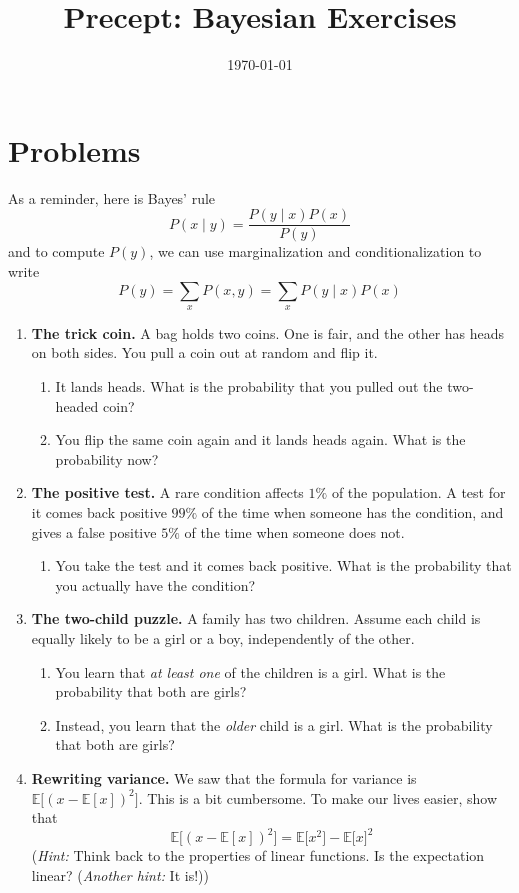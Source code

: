 \documentclass[11pt]{article}
\title{Precept: Bayesian Exercises}
\date{\today}
\newcommand{\E}{\mathbb{E}}
\begin{document}
\maketitle
\thispagestyle{fancy}

\section*{Problems}
As a reminder, here is Bayes' rule
\[
P(x\mid y) = \frac{P(y\mid x)P(x)}{P(y)}
\]
and to compute $P(y)$, we can use marginalization and conditionalization to write
\[
P(y) = \sum_x P(x,y) = \sum_x P(y\mid x) P(x)
\]

\begin{enumerate}
    \item \textbf{The trick coin.} A bag holds two coins. One is fair, and the other has heads on both sides. You pull a coin out at random and flip it.
    \begin{enumerate}
        \item It lands heads. What is the probability that you pulled out the two-headed coin?
        \item You flip the same coin again and it lands heads again. What is the probability now?
    \end{enumerate}

    \item \textbf{The positive test.} A rare condition affects $1\%$ of the population. A test for it comes back positive $99\%$ of the time when someone has the condition, and gives a false positive $5\%$ of the time when someone does not.
    \begin{enumerate}
        \item You take the test and it comes back positive. What is the probability that you actually have the condition?
    \end{enumerate}

    \item \textbf{The two-child puzzle.} A family has two children. Assume each child is equally likely to be a girl or a boy, independently of the other.
    \begin{enumerate}
        \item You learn that \emph{at least one} of the children is a girl. What is the probability that both are girls?
        \item Instead, you learn that the \emph{older} child is a girl. What is the probability that both are girls?
    \end{enumerate}

    \item \textbf{Rewriting variance.} We saw that the formula for variance is $\E\big[(x-\E[x])^2\big]$. This is a bit cumbersome. To make our lives easier, show that \[ \E\big[(x-\E[x])^2\big]=\E\big[x^2 \big] - \E\big[x\big]^2 \] (\textit{Hint:} Think back to the properties of linear functions. Is the expectation linear? (\textit{Another hint:} It is!))
\end{enumerate}
\end{document}
